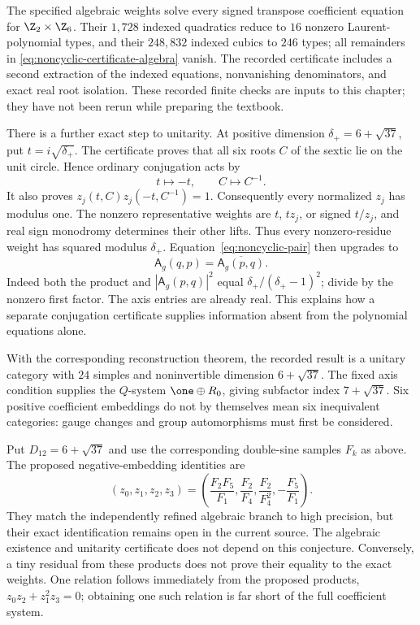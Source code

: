 \begin{constructioninput}
\label{input:noncyclic-twelve}
The specified algebraic weights solve every signed transpose
coefficient equation for $\Z_2\times\Z_6$. Their $1,728$
indexed quadratics reduce to $16$ nonzero Laurent-polynomial
types, and their $248,832$ indexed cubics to $246$ types;
all remainders in \eqref{eq:noncyclic-certificate-algebra} vanish.
The recorded certificate includes a second extraction of the
indexed equations, nonvanishing denominators, and exact real
root isolation. These recorded finite checks are inputs to this
chapter; they have not been rerun while preparing the textbook.
\end{constructioninput}

There is a further exact step to unitarity. At positive dimension
$\delta_+=6+\sqrt{37}$, put $t=i\sqrt{\delta_+}$. The
certificate proves that all six roots $C$ of the sextic lie on the
unit circle. Hence ordinary conjugation acts by
\[
 t\longmapsto-t,\qquad C\longmapsto C^{-1}.
\]
It also proves $z_j(t,C)z_j(-t,C^{-1})=1$. Consequently every
normalized $z_j$ has modulus one. The nonzero representative
weights are $t$, $tz_j$, or signed $t/z_j$, and real sign
monodromy determines their other lifts. Thus every nonzero-residue
weight has squared modulus $\delta_+$.
Equation~\eqref{eq:noncyclic-pair} then upgrades to
\[
 \mathsf A_g(q,p)=\overline{\mathsf A_g(p,q)}.
\]
Indeed both the product and $|\mathsf A_g(p,q)|^2$ equal
$\delta_+/(\delta_+-1)^2$; divide by the nonzero first factor.
The axis entries are already real. This explains how a separate
conjugation certificate supplies information absent from the
polynomial equations alone.

With the corresponding reconstruction theorem, the recorded
result is a unitary category with $24$ simples and noninvertible
dimension $6+\sqrt{37}$. The fixed axis condition supplies the
$Q$-system $\one\oplus R_0$, giving subfactor index
$7+\sqrt{37}$. Six positive coefficient embeddings do not by
themselves mean six inequivalent categories: gauge changes and
group automorphisms must first be considered.

\begin{remark}
Put $D_{12}=6+\sqrt{37}$ and use the corresponding double-sine
samples $F_k$ as above. The proposed negative-embedding identities are
\[
 (z_0,z_1,z_2,z_3)=
 \left(\frac{F_2F_5}{F_1},\frac{F_2}{F_4},
       \frac{F_2}{F_4^2},-\frac{F_5}{F_1}\right).
\]
They match the independently refined algebraic branch to high
precision, but their exact identification remains open in the
current source. The algebraic existence and unitarity certificate
does not depend on this conjecture. Conversely, a tiny residual
from these products does not prove their equality to the exact
weights. One relation follows immediately from the proposed
products, $z_0z_2+z_1^2z_3=0$; obtaining one such relation is
far short of the full coefficient system.
\end{remark}

